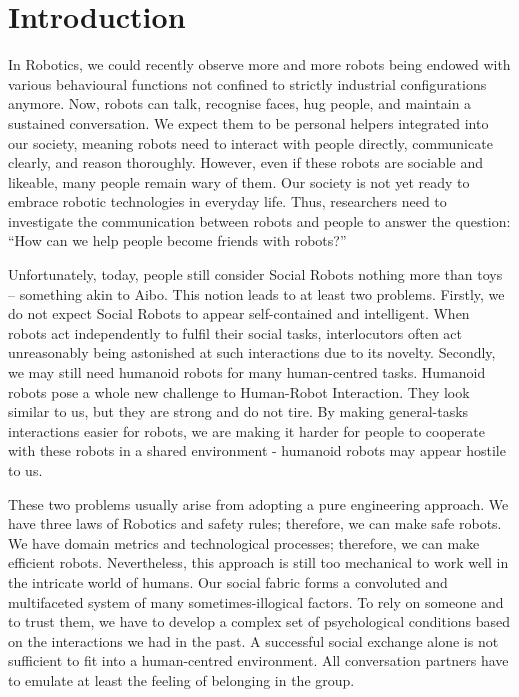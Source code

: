 
\chapter{Introduction}\label{chapter:introduction}

In Robotics, we could recently observe more and more robots being endowed with various behavioural functions not confined to strictly industrial configurations anymore. Now, robots can talk, recognise faces, hug people, and maintain a sustained conversation. We expect them to be personal helpers integrated into our society, meaning robots need to interact with people directly, communicate clearly, and reason thoroughly. However, even if these robots are sociable and likeable, many people remain wary of them. Our society is not yet ready to embrace robotic technologies in everyday life. Thus, researchers need to investigate the communication between robots and people to answer the question: “How can we help people become friends with robots?” 

Unfortunately, today, people still consider Social Robots nothing more than toys – something akin to Aibo. This notion leads to at least two problems. Firstly, we do not expect Social Robots to appear self-contained and intelligent. When robots act independently to fulfil their social tasks, interlocutors often act unreasonably being astonished at such interactions due to its novelty. Secondly, we may still need humanoid robots for many human-centred tasks. Humanoid robots pose a whole new challenge to Human-Robot Interaction. They look similar to us, but they are strong and do not tire. By making general-tasks interactions easier for robots, we are making it harder for people to cooperate with these robots in a shared environment - humanoid robots may appear hostile to us. 

These two problems usually arise from adopting a pure engineering approach. We have three laws of Robotics and safety rules; therefore, we can make safe robots. We have domain metrics and technological processes; therefore, we can make efficient robots. Nevertheless, this approach is still too mechanical to work well in the intricate world of humans. Our social fabric forms a convoluted and multifaceted system of many sometimes-illogical factors. To rely on someone and to trust them, we have to develop a complex set of psychological conditions based on the interactions we had in the past. A successful social exchange alone is not sufficient to fit into a human-centred environment. All conversation partners have to emulate  at least the feeling of belonging in the group.

